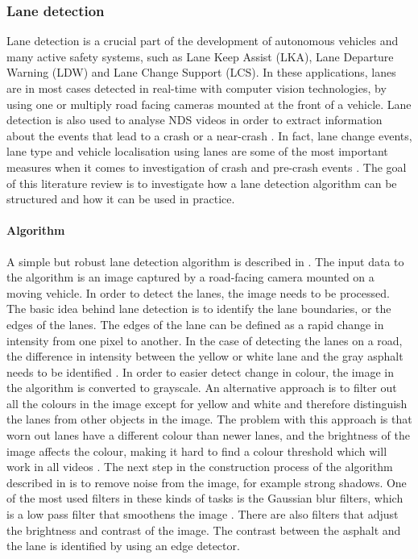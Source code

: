 \subsubsection{Lane detection}

Lane detection is a crucial part of the development of autonomous vehicles and many active safety systems, such as Lane Keep Assist (LKA), Lane Departure Warning (LDW) and Lane Change Support (LCS). In these applications, lanes are in most cases detected in real-time with computer vision technologies, by using one or multiply road facing cameras mounted at the front of a vehicle. Lane detection is also used to analyse NDS videos in order to extract information about the events that lead to a crash or a near-crash \cite{IEEE2014}. In fact, lane change events, lane type and vehicle localisation using lanes are some of the most important measures when it comes to investigation of crash and pre-crash events \cite{IEEE2014}. The goal of this literature review is to investigate how a lane detection algorithm can be structured and how it can be used in practice.

\paragraph{Algorithm}
A simple but robust lane detection algorithm is described in \cite{Compvision}. The input data to the algorithm is an image captured by a road-facing camera mounted on a moving vehicle. In order to detect the lanes, the image needs to be processed. The basic idea behind lane detection is to identify the lane boundaries, or the edges of the lanes. The edges of the lane can be defined as a rapid change in intensity from one pixel to another. In the case of detecting the lanes on a road, the difference in intensity between the yellow or white lane and the gray asphalt needs to be identified \cite{EdgeDet}. In order to easier detect change in colour, the image in the algorithm \cite{Compvision} is converted to grayscale. An alternative approach is to filter out all the colours in the image except for yellow and white and therefore distinguish the lanes from other objects in the image. The problem with this approach is that worn out lanes have a different colour than newer lanes, and the brightness of the image affects the colour,  making it hard to find a colour threshold which will work in all videos \cite{ColorScale}. The next step in the construction process of the algorithm described in \cite{Compvision} is to remove noise from the image, for example strong shadows. One of the most used filters in these kinds of tasks is the Gaussian blur filters, which is a low pass filter that smoothens the image \cite{GaussianFilter}. There are also filters that adjust the brightness and contrast of the image. The contrast between the asphalt and the lane is identified by using an edge detector.

